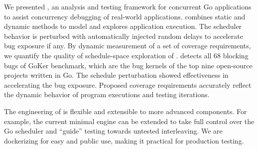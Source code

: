 We presented \goat, an analysis and testing framework for concurrent Go applications to assist concurrency debugging of real-world applications.
%
\goat combines static and dynamic methods to model and explores application execution.
%
The scheduler behavior is perturbed with automatically injected random delays to accelerate bug exposure if any.
%
By dynamic measurement of a set of coverage requirements, we quantify the quality of schedule-space exploration of \goat.
%
\goat detects all 68 blocking bugs of GoKer benchmark, which are the bug kernels of the top nine open-source projects written in Go.
%
The schedule perturbation showed effectiveness in accelerating the bug exposure.
%
Proposed coverage requirements accurately reflect the dynamic behavior of program executions and testing iterations.

The engineering of \goat is flexible and extensible to more advanced components.
%
For example, the current minimal \goat engine can be extended to take full control over the Go scheduler and ``guide'' testing towards untested interleaving.
%
We are dockerizing \goat for easy and public use, making it practical for production testing.
